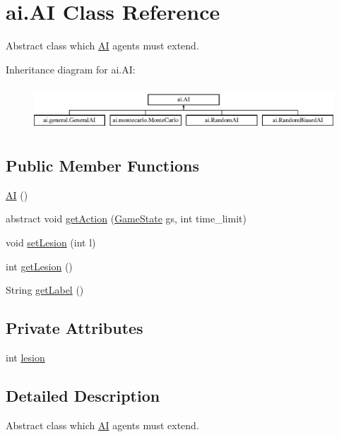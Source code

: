 \hypertarget{classai_1_1_a_i}{
\section{ai.AI Class Reference}
\label{classai_1_1_a_i}
}


Abstract class which \hyperlink{classai_1_1_a_i}{AI} agents must extend.  


Inheritance diagram for ai.AI:\begin{figure}[H]
\begin{center}
\leavevmode
\includegraphics[height=1.686747cm]{classai_1_1_a_i}
\end{center}
\end{figure}
\subsection*{Public Member Functions}
\begin{DoxyCompactItemize}
\item 
\hyperlink{classai_1_1_a_i_a4f825aa58ed584eb5714b5010f779d65}{AI} ()
\item 
abstract void \hyperlink{classai_1_1_a_i_ac99863ed57cf48013d00267919044ef2}{getAction} (\hyperlink{classrts_1_1_game_state}{GameState} gs, int time\_\-limit)
\item 
void \hyperlink{classai_1_1_a_i_aefc10ccb08c3b52c5c47529089dbf613}{setLesion} (int l)
\item 
int \hyperlink{classai_1_1_a_i_a993c7f77f0b3f2b2d7ae4f37020033d0}{getLesion} ()
\item 
String \hyperlink{classai_1_1_a_i_a88d898fe81c137f04c130acfe9575851}{getLabel} ()
\end{DoxyCompactItemize}
\subsection*{Private Attributes}
\begin{DoxyCompactItemize}
\item 
int \hyperlink{classai_1_1_a_i_acc53cf59d664bfb248c0ebf1f7eec938}{lesion}
\end{DoxyCompactItemize}


\subsection{Detailed Description}
Abstract class which \hyperlink{classai_1_1_a_i}{AI} agents must extend. 

